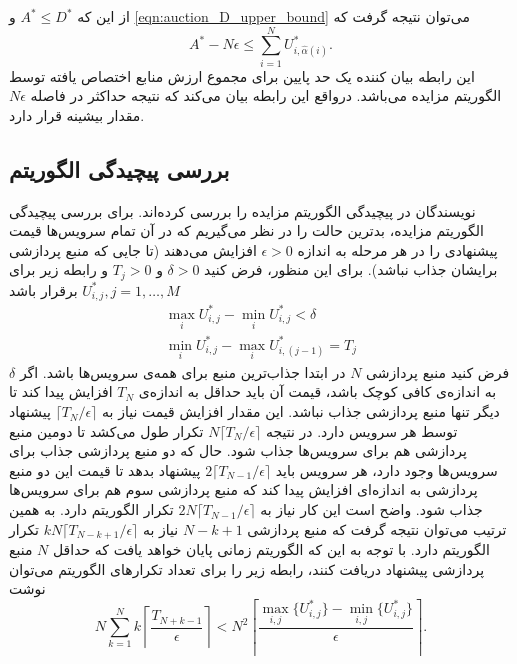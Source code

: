       از این که $A^* \le D^*$ و \cref{eqn:auction_D_upper_bound} می‌توان نتیجه گرفت که
      \begin{equation}
        A^* - N \epsilon \le \sum_{i=1}^N U_{i, \hat \alpha (i)}^*.
      \end{equation}
      این رابطه بیان کننده یک حد پایین برای مجموع ارزش منابع اختصاص یافته توسط الگوریتم مزایده می‌باشد.
      درواقع این رابطه بیان می‌کند که نتیجه حداکثر در فاصله $N \epsilon$ مقدار بیشینه قرار دارد.
    \subsection{بررسی پیچیدگی الگوریتم}
      نویسندگان در \cite{distributed_auction_algorithms_zavlanos} پیچیدگی الگوریتم مزایده را بررسی کرده‌اند.
      برای بررسی پیچیدگی الگوریتم مزایده، بدترین حالت را در نظر می‌گیریم که در آن تمام سرویس‌ها قیمت پیشنهادی را در هر مرحله به اندازه $\epsilon > 0$ افزایش می‌دهند (تا جایی که منبع پردازشی برایشان جذاب نباشد).
      برای این منظور، فرض کنید $\delta > 0$ و $T_j>0$ و رابطه زیر برای $U_{i,j}^*, j=1,\hdots,M$ برقرار باشد
      \begin{gather}
        \max_i U_{i,j}^* - \min_i U_{i,j}^* < \delta \\
        \min_i U_{i,j}^* - \max_i U_{i,(j-1)}^* = T_j
      \end{gather}
      فرض کنید منبع پردازشی $N$ در ابتدا جذاب‌ترین منبع برای همه‌ی سرویس‌ها باشد.
      اگر $\delta$ به اندازه‌ی کافی کوچک باشد، قیمت آن باید حداقل به اندازه‌ی $T_N$ افزایش پیدا کند تا دیگر تنها منبع پردازشی جذاب نباشد.
      این مقدار افزایش قیمت نیاز به $\lceil T_N / \epsilon \rceil$ پیشنهاد توسط هر سرویس دارد.
      در نتیجه $N \lceil T_N / \epsilon \rceil$ تکرار طول می‌کشد تا دومین منبع پردازشی هم برای سرویس‌ها جذاب شود.
      حال که دو منبع پردازشی جذاب برای سرویس‌ها وجود دارد، هر سرویس باید $2 \lceil T_{N-1} / \epsilon \rceil$ پیشنهاد بدهد تا قیمت این دو منبع پردازشی به اندازه‌ای افزایش پیدا کند که منبع پردازشی سوم هم برای سرویس‌ها جذاب شود.
      واضح است این کار نیاز به $2N \lceil T_{N-1} / \epsilon \rceil$ تکرار الگوریتم دارد.
      به همین ترتیب می‌توان نتیجه گرفت که منبع پردازشی $N-k+1$ نیاز به $kN \lceil T_{N-k+1} / \epsilon \rceil$ تکرار الگوریتم دارد.
      با توجه به این که الگوریتم زمانی پایان خواهد یافت که حداقل $N$ منبع پردازشی پیشنهاد دریافت کنند، رابطه زیر را برای تعداد تکرار‌های الگوریتم می‌توان نوشت
      \begin{equation}
        N\sum_{k=1}^N k \left \lceil \frac{T_{N+k-1}}{\epsilon} \right\rceil < N ^ 2 \left \lceil \frac{\max_{i,j} \{U_{i,j}^*\} - \min_{i,j} \{U_{i,j}^*\}}{\epsilon} \right\rceil.
      \end{equation}
